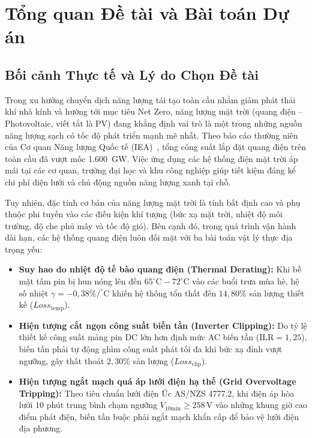 \documentclass[12pt, a4paper]{report}
\begin{document}
\chapter{Tổng quan Đề tài và Bài toán Dự án}
\label{chap:tongquan}

\section{Bối cảnh Thực tế và Lý do Chọn Đề tài}
\label{sec:lydo}

Trong xu hướng chuyển dịch năng lượng tái tạo toàn cầu nhằm giảm phát thải khí nhà kính và hướng tới mục tiêu Net Zero, năng lượng mặt trời (quang điện -- Photovoltaic, viết tắt là PV) đang khẳng định vai trò là một trong những nguồn năng lượng sạch có tốc độ phát triển mạnh mẽ nhất. Theo báo cáo thường niên của Cơ quan Năng lượng Quốc tế (IEA)~\cite{iea2023pvps}, tổng công suất lắp đặt quang điện trên toàn cầu đã vượt mốc 1.600~GW. Việc ứng dụng các hệ thống điện mặt trời áp mái tại các cơ quan, trường đại học và khu công nghiệp giúp tiết kiệm đáng kể chi phí điện lưới và chủ động nguồn năng lượng xanh tại chỗ.

Tuy nhiên, đặc tính cơ bản của năng lượng mặt trời là tính bất định cao và phụ thuộc phi tuyến vào các điều kiện khí tượng (bức xạ mặt trời, nhiệt độ môi trường, độ che phủ mây và tốc độ gió). Bên cạnh đó, trong quá trình vận hành dài hạn, các hệ thống quang điện luôn đối mặt với ba bài toán vật lý thực địa trọng yếu:
\begin{itemize}[noitemsep]
    \item \textbf{Suy hao do nhiệt độ tế bào quang điện (Thermal Derating):} Khi bề mặt tấm pin bị hun nóng lên đến $65^\circ\text{C} - 72^\circ\text{C}$ vào các buổi trưa mùa hè, hệ số nhiệt $\gamma = -0{,}38\%/^\circ\text{C}$ khiến hệ thống tổn thất đến $14{,}80\%$ sản lượng thiết kế ($Loss_{\text{temp}}$).
    \item \textbf{Hiện tượng cắt ngọn công suất biến tần (Inverter Clipping):} Do tỷ lệ thiết kế công suất mảng pin DC lớn hơn định mức AC biến tần ($\text{ILR} = 1{,}25$), biến tần phải tự động ghìm công suất phát tối đa khi bức xạ đỉnh vượt ngưỡng, gây thất thoát $2{,}30\%$ sản lượng ($Loss_{\text{clip}}$).
    \item \textbf{Hiện tượng ngắt mạch quá áp lưới điện hạ thế (Grid Overvoltage Tripping):} Theo tiêu chuẩn lưới điện Úc AS/NZS 4777.2, khi điện áp hòa lưới $10$ phút trung bình chạm ngưỡng $V_{10\text{min}} \ge 258\,\text{V}$ vào những khung giờ cao điểm phát điện, biến tần buộc phải ngắt mạch khẩn cấp để bảo vệ lưới điện địa phương.
\end{itemize}
\end{document}
